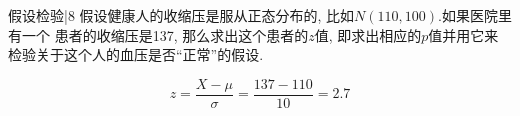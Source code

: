 \newChapter 假设检验|8
\exer 假设健康人的收缩压是服从正态分布的, 比如$N(110, 100)$.如果医院里有一个 患者的收缩压是137, 那么求出这个患者的$z$值, 即求出相应的$p$值并用它来检验关于这个人的血压是否“正常”的假设.\par
\[z=\frac{X-\mu}{\sigma}=\frac{137-110}{10}=2.7\]

